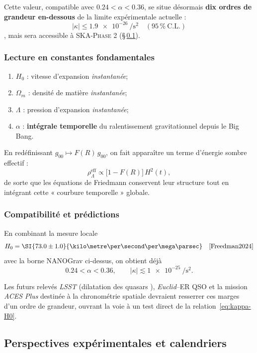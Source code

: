\documentclass[11pt]{article}
\begin{document}
Cette valeur, compatible avec
\(0.24<\alpha<0.36\),
se situe désormais \textbf{dix ordres de grandeur en-dessous} de la limite
expérimentale actuelle :
\[
  |\kappa| \le \SI{1.9e-26}{\per\square\second}
  \quad(95\,\%\ \text{C.L.})
\]
\cite{Arzoumanian2023},
mais sera accessible à \textsc{SKA-Phase 2}
(§\,\ref{sec:perspectives}).

\subsubsection{Lecture en constantes fondamentales}

\begin{enumerate}[label=\alph*)]
  \item \(H_{0}\) : vitesse d’expansion \emph{instantanée};
  \item \(\Omega_{m}\) : densité de matière \emph{instantanée};
  \item \(\Lambda\) : pression d’expansion \emph{instantanée};
  \item \(\alpha\) : \textbf{intégrale temporelle} du ralentissement
        gravitationnel depuis le Big Bang.
\end{enumerate}

En redéfinissant \(g_{00}\mapsto F(R)\,g_{00}\), on fait apparaître
un terme d’énergie sombre effectif :
\[
  \rho_{\Lambda}^{\mathrm{eff}} 
  \propto
  \bigl[1-F(R)\bigr]\,H^{2}(t),
\]
de sorte que les équations de Friedmann conservent leur structure
tout en intégrant cette « courbure temporelle » globale.

\subsubsection{Compatibilité et prédictions}

En combinant la mesure locale
\[
  H_{0}= \SI{73.0 \pm 1.0}{\kilo\metre\per\second\per\mega\parsec}
  \quad\text{\cite{Freedman2024}}
\]
avec la borne NANOGrav ci-dessus, on obtient déjà
\[
  0.24 < \alpha < 0.36,
  \qquad
  |\kappa| \lesssim \SI{1e-25}{\per\square\second}.
\]

Les futurs relevés \emph{LSST} (dilatation des quasars
\parencite{Cao2023,Zheng2023}),
\emph{Euclid}–ER QSO \parencite{Euclid2024}
et la mission \emph{ACES Plus} destinée à la chronométrie spatiale
devraient resserrer ces marges d’un ordre de grandeur, ouvrant la voie
à un test direct de la relation~\eqref{eq:kappa-H0}.

\subsection{Perspectives expérimentales et calendriers}
\label{sec:perspectives}
\end{document}

